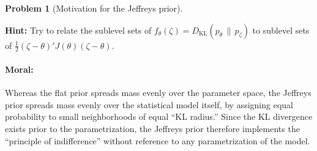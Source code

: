 \documentclass{article}
\theoremstyle{definition}
\newtheorem{problem}{Problem}
\begin{document}
\begin{problem}[Motivation for the Jeffreys prior]
\begin{enumerate}[(a)]
  {\bf Hint:} Try to relate the sublevel sets of $f_\theta(\zeta) = D_{\text{KL}}(p_{\theta}\,\|\,p_\zeta)$ to sublevel sets of $\frac{1}{2}(\zeta-\theta)'J(\theta)(\zeta-\theta)$.



\end{enumerate}

\paragraph{Moral:} Whereas the flat prior spreads mass evenly over the parameter space, the Jeffreys prior spreads mass evenly over the statistical model itself, by assigning equal probability to small neighborhoods of equal ``KL radius.'' Since the KL divergence exists prior to the parametrization, the Jeffreys prior therefore implements the ``principle of indifference'' without reference to any parametrization of the model.

\end{problem}





\end{document}
